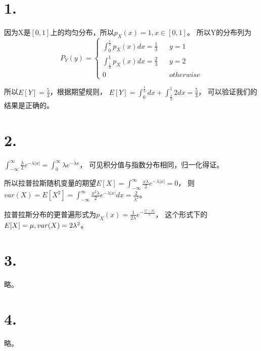 \documentclass[UTF8]{report}
\begin{document}
    \section*{1.}
        因为X是$[0, 1]$上的均匀分布，所以$p_X(x) = 1, x \in [0, 1]$。
        所以Y的分布列为
        $$P_Y(y) = \left\{
            \begin{array}{lcr}
                \int_{0}^{\frac{1}{3}}p_X(x)dx = \frac{1}{3} & & y = 1\\
                \int_{\frac{1}{3}}^{1}p_X(x)dx = \frac{2}{3} & & y = 2\\
                0 & & otherwise
            \end{array}
        \right.$$

        所以$E[Y] = \frac{5}{3}$，根据期望规则，
        $E[Y] = \int_{0}^{\frac{1}{3}}dx + \int_{\frac{1}{3}}^{1}2dx = \frac{5}{3}$，
        可以验证我们的结果是正确的。
    \section*{2.}
        $\int_{-\infty}^{\infty}\frac{\lambda}{2}e^{-\lambda |x|} = \int_{0}^{\infty}\lambda e^{-\lambda x}$，
        可见积分值与指数分布相同，归一化得证。

        所以拉普拉斯随机变量的期望$E[X] = \int_{-\infty}^{\infty}\frac{x\lambda}{2}e^{-\lambda |x|} = 0$，
        则$var(X) = E[X^2] = \int_{-\infty}^{\infty}\frac{x^2\lambda}{2}e^{-\lambda |x|}dx = \frac{2}{\lambda^2}$。

        拉普拉斯分布的更普遍形式为$p_X(x) = \frac{1}{2\lambda}e^{-\frac{|x - \mu|}{\lambda}}$，
        这个形式下的$\\E[X] = \mu, var(X) = 2\lambda^2$。
    \section*{3.}
        略。
    \section*{4.}
        略。
\end{document}
